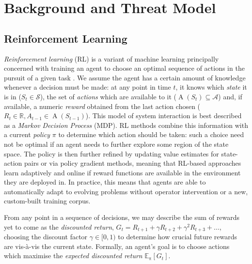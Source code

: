\documentclass[conference, letterpaper, 10pt, times]{IEEEtran}
\begin{document}
\section{Background and Threat Model}
\subsection{Reinforcement Learning}\label{sec:reinforcement-learning}
\emph{Reinforcement learning} (RL) is a variant of machine learning principally concerned with training an agent to choose an optimal sequence of actions in the pursuit of a given task \cite{RL2E}.
We assume the agent has a certain amount of knowledge whenever a decision must be made: at any point in time $t$, it knows which \emph{state} it is in ($S_t \in \mathcal{S}$), the set of \emph{actions} which are available to it ($\operatorname{A}(S_t) \subseteq \mathcal{A}$) and, if available, a numeric \emph{reward} obtained from the last action chosen ($R_t \in \mathbb{R}, A_{t-1} \in \operatorname{A}(S_{t-1})$).
This model of system interaction is best described as a \emph{Markov Decision Process} (MDP).
RL methods combine this information with a current \emph{policy} $\pi$ to determine which action should be taken: such a choice need not be optimal if an agent needs to further explore some region of the state space.
The policy is then further refined by updating value estimates for state-action pairs or via policy gradient methods, meaning that RL-based approaches learn adaptively and online if reward functions are available in the environment they are deployed in.
In practice, this means that agents are able to automatically adapt to evolving problems without operator intervention or a new, custom-built training corpus.

From any point in a sequence of decisions, we may describe the sum of rewards yet to come as the \emph{discounted return}, $G_t = R_{t+1} + \gamma R_{t+2} + \gamma^2 R_{t+3} + \ldots$, choosing the discount factor $\gamma \in [0,1)$ to determine how crucial future rewards are vis-\`{a}-vis the current state.
Formally, an agent's goal is to choose actions which maximise the \emph{expected discounted return} $\operatorname{\mathbb{E}_{\pi}}[G_t]$.

\end{document}
